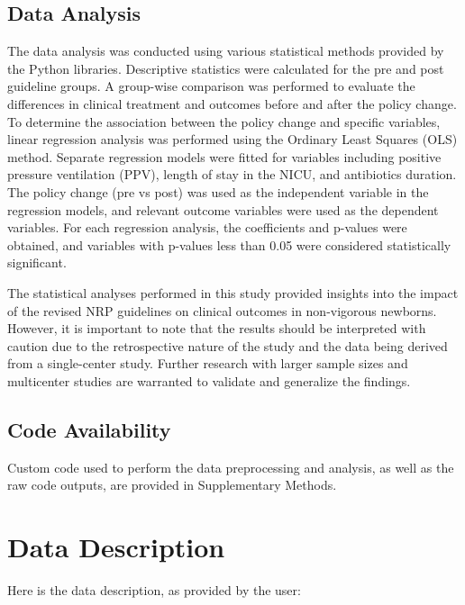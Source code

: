 \documentclass[11pt]{article}
\begin{document}
\subsection*{Data Analysis}
The data analysis was conducted using various statistical methods provided by the Python libraries. Descriptive statistics were calculated for the pre and post guideline groups. A group-wise comparison was performed to evaluate the differences in clinical treatment and outcomes before and after the policy change. To determine the association between the policy change and specific variables, linear regression analysis was performed using the Ordinary Least Squares (OLS) method. Separate regression models were fitted for variables including positive pressure ventilation (PPV), length of stay in the NICU, and antibiotics duration. The policy change (pre vs post) was used as the independent variable in the regression models, and relevant outcome variables were used as the dependent variables. For each regression analysis, the coefficients and p-values were obtained, and variables with p-values less than 0.05 were considered statistically significant.

The statistical analyses performed in this study provided insights into the impact of the revised NRP guidelines on clinical outcomes in non-vigorous newborns. However, it is important to note that the results should be interpreted with caution due to the retrospective nature of the study and the data being derived from a single-center study. Further research with larger sample sizes and multicenter studies are warranted to validate and generalize the findings.\subsection*{Code Availability}

Custom code used to perform the data preprocessing and analysis, as well as the raw code outputs, are provided in Supplementary Methods.


\clearpage
\appendix

\section{Data Description} \label{sec:data_description} Here is the data description, as provided by the user:
\end{document}
